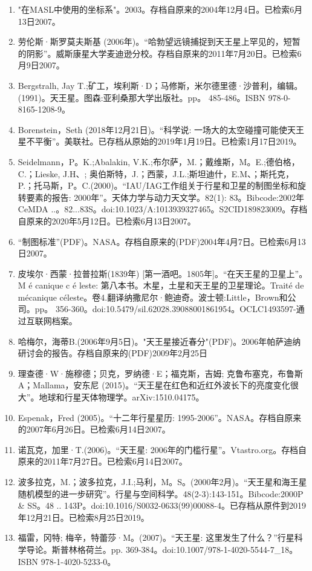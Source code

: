 \begin{enumerate}
\item "在MASL中使用的坐标系"。2003。存档自原来的2004年12月4日。已检索6月13日2007。
\item 劳伦斯·斯罗莫夫斯基 (2006年)。“哈勃望远镜捕捉到天王星上罕见的，短暂的阴影”。威斯康星大学麦迪逊分校。存档自原来的2011年7月20日。已检索6月9日2007。
\item Bergstralh, Jay T.;矿工，埃利斯·D；马修斯，米尔德里德·沙普利，编辑。(1991)。天王星。图森:亚利桑那大学出版社。pp。 485-486。ISBN 978-0-8165-1208-9。
\item Borenstein，Seth (2018年12月21日)。“科学说: 一场大的太空碰撞可能使天王星不平衡”。美联社。已存档从原始的2019年1月19日。已检索1月17日2019。
\item Seidelmann，P。K.;Abalakin, V.K.;布尔萨，M.；戴维斯，M。E.;德伯格，C.；Lieske, J.H、; 奥伯斯特，J.；西蒙，J.L.;斯坦迪什，E.M、；斯托克，P.；托马斯，P。C.(2000)。“IAU/IAG工作组关于行星和卫星的制图坐标和旋转要素的报告: 2000年”。天体力学与动力天文学。82(1): 83。Bibcode:2002年CeMDA ..。82...83S。doi:10.1023/A:1013939327465。S2CID189823009。存档自原来的2020年5月12日。已检索6月13日2007。 
\item “制图标准”(PDF)。NASA。存档自原来的(PDF)2004年4月7日。已检索6月13日2007。
\item 皮埃尔·西蒙·拉普拉斯(1839年) [第一酒吧。1805年]。“在天王星的卫星上”。M é canique c é leste: 第八本书。木星，土星和天王星的卫星理论。Traité de mécanique céleste。卷4.翻译纳撒尼尔·鲍迪奇。波士顿:Little，Brown和公司。pp。 356-360。doi:10.5479/sil.62028.39088001861954。OCLC1493597-通过互联网档案。 
\item 哈梅尔，海蒂B.(2006年9月5日)。"天王星接近春分"(PDF)。2006年帕萨迪纳研讨会的报告。存档自原来的(PDF)2009年2月25日
\item 理查德·W·施穆德；贝克，罗纳德·E；福克斯，吉姆; 克鲁布塞克，布鲁斯A；Mallama，安东尼 (2015)。“天王星在红色和近红外波长下的亮度变化很大”。地球和行星天体物理学。arXiv:1510.04175。
\item Espenak，Fred (2005)。“十二年行星星历: 1995-2006”。NASA。存档自原来的2007年6月26日。已检索6月14日2007。
\item 诺瓦克，加里·T.(2006)。“天王星: 2006年的门槛行星”。Vtastro.org。存档自原来的2011年7月27日。已检索6月14日2007。
\item 波多拉克，M.；波多拉克，J.I.;马利，M。S。(2000年2月)。“天王星和海王星随机模型的进一步研究”。行星与空间科学。48(2-3):143-151。Bibcode:2000P & SS。48 .. 143P。doi:10.1016/S0032-0633(99)00088-4。已存档从原件到2019年12月21日。已检索8月25日2019。
\item 福雷，冈特; 梅辛，特蕾莎·M。(2007)。“天王星: 这里发生了什么？”行星科学导论。斯普林格荷兰。pp. 369-384。doi:10.1007/978-1-4020-5544-7_18。ISBN  978-1-4020-5233-0。

\end{enumerate}

